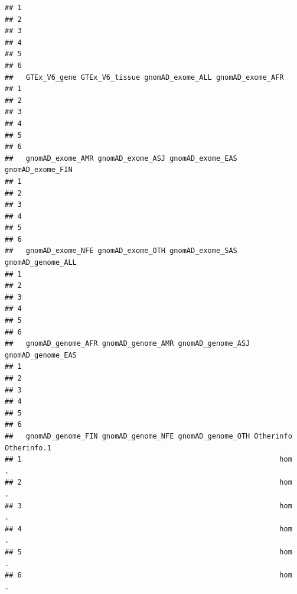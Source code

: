 \documentclass[
]{article}
\begin{document}
\begin{verbatim}
## 1                                                                  
## 2                                                                  
## 3                                                                  
## 4                                                                  
## 5                                                                  
## 6                                                                  
##   GTEx_V6_gene GTEx_V6_tissue gnomAD_exome_ALL gnomAD_exome_AFR
## 1                                                              
## 2                                                              
## 3                                                              
## 4                                                              
## 5                                                              
## 6                                                              
##   gnomAD_exome_AMR gnomAD_exome_ASJ gnomAD_exome_EAS gnomAD_exome_FIN
## 1                                                                    
## 2                                                                    
## 3                                                                    
## 4                                                                    
## 5                                                                    
## 6                                                                    
##   gnomAD_exome_NFE gnomAD_exome_OTH gnomAD_exome_SAS gnomAD_genome_ALL
## 1                                                                     
## 2                                                                     
## 3                                                                     
## 4                                                                     
## 5                                                                     
## 6                                                                     
##   gnomAD_genome_AFR gnomAD_genome_AMR gnomAD_genome_ASJ gnomAD_genome_EAS
## 1                                                                        
## 2                                                                        
## 3                                                                        
## 4                                                                        
## 5                                                                        
## 6                                                                        
##   gnomAD_genome_FIN gnomAD_genome_NFE gnomAD_genome_OTH Otherinfo Otherinfo.1
## 1                                                             hom           .
## 2                                                             hom           .
## 3                                                             hom           .
## 4                                                             hom           .
## 5                                                             hom           .
## 6                                                             hom           .
\end{verbatim}
\end{document}
